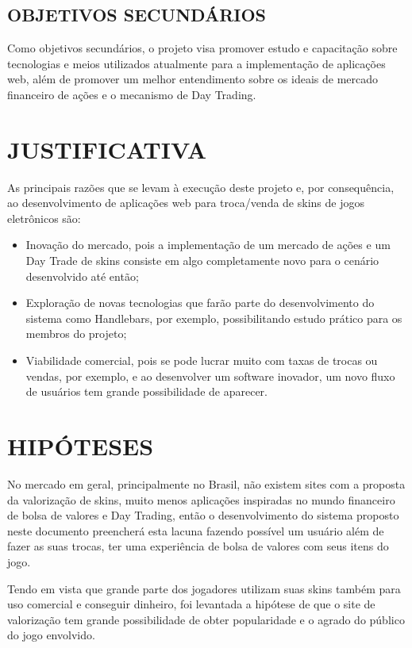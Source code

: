 \documentclass[a4paper, 12pt]{article}
\begin{document}
    \subsection{OBJETIVOS SECUNDÁRIOS}
    Como objetivos secundários, o projeto visa promover estudo e capacitação sobre tecnologias e meios utilizados atualmente para a implementação de aplicações web, além de promover um melhor entendimento sobre os ideais de mercado financeiro de ações e o mecanismo de Day Trading.
    
    \section{JUSTIFICATIVA}
    As principais razões que se levam à execução deste projeto e, por consequência, ao desenvolvimento de aplicações web para troca/venda de skins de jogos eletrônicos são: 

    \begin{itemize}
        \item Inovação do mercado, pois a implementação de um mercado de ações e um Day Trade de skins consiste em algo completamente novo para o cenário desenvolvido até então;
        \item Exploração de novas tecnologias que farão parte do desenvolvimento do sistema como Handlebars, por exemplo, possibilitando estudo prático para os membros do projeto;
        \item Viabilidade comercial, pois se pode lucrar muito com taxas de trocas ou vendas, por exemplo, e ao desenvolver um software inovador, um novo fluxo de usuários tem grande possibilidade de aparecer.
      \end{itemize}

    \section{HIPÓTESES}
    No mercado em geral, principalmente no Brasil, não existem sites com a proposta da valorização de skins, muito menos aplicações inspiradas no mundo financeiro de bolsa de valores e Day Trading, então o desenvolvimento do sistema proposto neste documento preencherá esta lacuna fazendo possível um usuário além de fazer as suas trocas, ter uma experiência de bolsa de valores com seus itens do jogo. 
    
    Tendo em vista que grande parte dos jogadores utilizam suas skins também para uso comercial e conseguir dinheiro, foi levantada a hipótese de que o site de valorização tem grande possibilidade de obter popularidade e o agrado do público do jogo envolvido.
\end{document}
